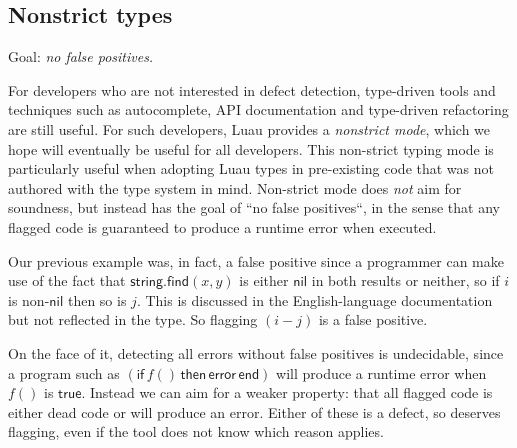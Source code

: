 \documentclass[acmsmall]{acmart}
\newcommand{\NIL}{\mathsf{nil}}
\newcommand{\TRUE}{\mathsf{true}}
\newcommand{\STRING}{\mathsf{string}}
\newcommand{\ERROR}{\mathsf{error}}
\newcommand{\IF}{\mathsf{if}\,}
\newcommand{\THEN}{\,\mathsf{then}\,}
\newcommand{\END}{\,\mathsf{end}}
\newcommand{\FIND}{\mathsf{find}}
\begin{document}
\subsection{Nonstrict types}

Goal: \emph{no false positives.}

For developers who are not interested in defect detection, type-driven
tools and techniques such as autocomplete, API documentation
and type-driven refactoring are still useful.
For such developers, Luau provides a
\emph{nonstrict mode}, which we hope will eventually be useful for all
developers.  This non-strict typing mode is particularly useful when
adopting Luau types in pre-existing code that was not authored with
the type system in mind.  Non-strict mode does \emph{not} aim for
soundness, but instead has the goal of ``no false positives``, in the
sense that any flagged code is guaranteed to produce a runtime error
when executed.

Our previous example was, in fact, a false positive since a programmer
can make use of the fact that $\STRING.\FIND(x, y)$ is either $\NIL$
in both results or neither, so if $i$ is non-$\NIL$ then so is $j$.
This is discussed in the English-language documentation but not reflected
in the type. So flagging $(i - j)$ is a false positive.

On the face of it, detecting all errors without false positives is undecidable, since a program such as
$(\IF f() \THEN \ERROR \END)$ will produce a runtime error when $f()$ is
$\TRUE$. Instead we can aim for a weaker property: that all flagged code
is either dead code or will produce an error. Either of these is a
defect, so deserves flagging, even if the tool does not know
which reason applies.
\end{document}
